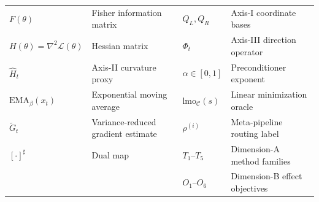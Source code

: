 \begin{table}[!t]
\begin{tabularx}{\textwidth}{@{}>{\raggedright\arraybackslash}p{}>{\raggedright\arraybackslash}X|>{\raggedright\arraybackslash}p{}>{\raggedright\arraybackslash}X@{}}
    $F(\theta)$ & Fisher information matrix &
    $Q_L,Q_R$ & Axis-I coordinate bases \\

    $H(\theta)=\nabla^2\mathcal{L}(\theta)$ & Hessian matrix &
    $\Phi_t$ & Axis-III direction operator \\

    $\hat{H}_t$ & Axis-II curvature proxy &
    $\alpha\in[0,1]$ & Preconditioner exponent \\

    $\mathrm{EMA}_\beta(x_t)$ & Exponential moving average &
    $\mathrm{lmo}_{\mathcal{C}}(s)$ & Linear minimization oracle \\

    $\tilde{G}_t$ & Variance-reduced gradient estimate &
    $\rho^{(i)}$ & Meta-pipeline routing label \\

    $[\cdot]^\sharp$ & Dual map &
    $T_1$--$T_5$ & Dimension-A method families \\

    && $O_1$--$O_6$ & Dimension-B effect objectives \\

    \bottomrule
  \end{tabularx}
\end{table}
